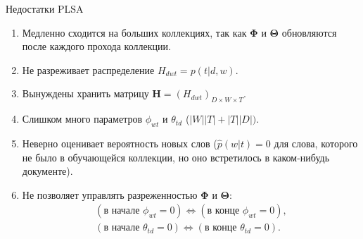 \documentclass[unicode,9pt, pdf]{beamer}
\begin{document}
\begin{frame}{Недостатки PLSA}
\begin{enumerate}
    \item Медленно сходится на больших коллекциях, так как $\mathbf{\Phi}$ и $\mathbf{\Theta}$ обновляются после каждого прохода коллекции.
    
    \hspace{0.1 cm}
    
    \item Не разреживает распределение $H_{d w t} = p(t| d, w)$.
    
    \hspace{0.1 cm}
    
    \item Вынуждены хранить матрицу $\mathbf{H} = (H_{d w t})_{D \times W \times T}$.
    
    \hspace{0.1 cm}
    
    \item Слишком много параметров $\phi_{w t}$ и $\theta_{t d}$ ($|W||T| + |T||D|)$.
    
    \hspace{0.1 cm}
    
    \item Неверно оценивает вероятность новых слов ($\hat{p}(w|t) = 0$ для слова, которого не было в обучающейся коллекции, но оно встретилось в каком-нибудь документе).
    
    \hspace{0.1 cm}
    
    \item Не позволяет управлять разреженностью $\mathbf{\Phi}$ и $\mathbf{\Theta}$:
    \begin{gather*}
        (\text{в начале } \phi_{w t} = 0) \Leftrightarrow  (\text{в конце }  \phi_{w t} = 0),\\
         (\text{в начале }  \theta_{t d} = 0) \Leftrightarrow  (\text{в конце } \theta_{t d} = 0).
    \end{gather*}
\end{enumerate}
    
\end{frame}
\end{document}
